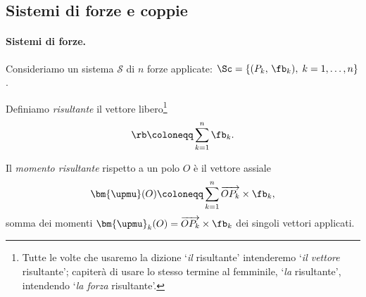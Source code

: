 \subsection{Sistemi di forze e coppie}



\paragraph{Sistemi di forze.}
Consideriamo un sistema $\mathcal{S}$ di $n$ forze applicate:
$\Sc=\{(P_k,\,\fb_k), \;k=1,\dots,n\}$. 

Definiamo \textit{risultante} il vettore libero\footnote{Tutte le volte che usaremo la dizione `\textit{il} risultante' intenderemo   `\textit{il vettore} risultante'; capiterà di usare lo stesso termine al femminile, `\textit{la} risultante', intendendo `\textit{la forza} risultante'.}
\begin{equation}\label{eq:risultante}
	\rb \coloneqq \sum_{k=1}^{n} \fb_k.
\end{equation}

Il \textit{momento risultante} rispetto a un polo $O$ è il
vettore assiale
\begin{equation}\label{eq:momento_risultante}
	\bm{\upmu}(O) \coloneqq \sum_{k=1}^{n}
	\overrightarrow{OP_k} \times \fb_k,
\end{equation}
somma dei momenti $\bm{\upmu}_k(O) =
\overrightarrow{OP_k} \times \fb_k$ dei singoli vettori
applicati.


